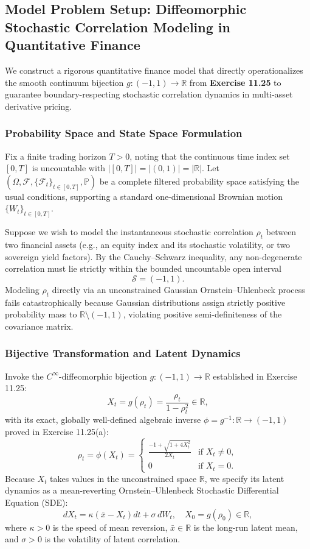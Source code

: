 \documentclass[11pt, letterpaper]{article}
\theoremstyle{definition}
\theoremstyle{remark}
\begin{document}
\subsection{Model Problem Setup: Diffeomorphic Stochastic Correlation Modeling in Quantitative Finance}

We construct a rigorous quantitative finance model that directly operationalizes the smooth continuum bijection $g : (-1, 1) \to \mathbb{R}$ from \textbf{Exercise 11.25} to guarantee boundary-respecting stochastic correlation dynamics in multi-asset derivative pricing.

\subsubsection{Probability Space and State Space Formulation}
Fix a finite trading horizon $T > 0$, noting that the continuous time index set $[0, T]$ is uncountable with $|[0, T]| = |(0, 1)| = |\mathbb{R}|$. Let $(\Omega, \mathcal{F}, \{\mathcal{F}_t\}_{t \in [0, T]}, \mathbb{P})$ be a complete filtered probability space satisfying the usual conditions, supporting a standard one-dimensional Brownian motion $\{W_t\}_{t \in [0, T]}$.

Suppose we wish to model the instantaneous stochastic correlation $\rho_t$ between two financial assets (e.g., an equity index and its stochastic volatility, or two sovereign yield factors). By the Cauchy–Schwarz inequality, any non-degenerate correlation must lie strictly within the bounded uncountable open interval
\[
\mathcal{S} = (-1, 1).
\]
Modeling $\rho_t$ directly via an unconstrained Gaussian Ornstein–Uhlenbeck process fails catastrophically because Gaussian distributions assign strictly positive probability mass to $\mathbb{R} \setminus (-1, 1)$, violating positive semi-definiteness of the covariance matrix.

\subsubsection{Bijective Transformation and Latent Dynamics}
Invoke the $C^\infty$-diffeomorphic bijection $g : (-1, 1) \to \mathbb{R}$ established in Exercise 11.25:
\[
X_t = g(\rho_t) = \frac{\rho_t}{1 - \rho_t^2} \in \mathbb{R},
\]
with its exact, globally well-defined algebraic inverse $\phi = g^{-1} : \mathbb{R} \to (-1, 1)$ proved in Exercise 11.25(a):
\[
\rho_t = \phi(X_t) = \begin{cases}
\displaystyle \frac{-1 + \sqrt{1 + 4X_t^2}}{2X_t} & \text{if } X_t \neq 0, \\[10pt]
0 & \text{if } X_t = 0.
\end{cases}
\]
Because $X_t$ takes values in the unconstrained space $\mathbb{R}$, we specify its latent dynamics as a mean-reverting Ornstein–Uhlenbeck Stochastic Differential Equation (SDE):
\begin{equation}
dX_t = \kappa\left(\bar{x} - X_t\right) dt + \sigma\, dW_t, \quad X_0 = g(\rho_0) \in \mathbb{R},
\end{equation}
where $\kappa > 0$ is the speed of mean reversion, $\bar{x} \in \mathbb{R}$ is the long-run latent mean, and $\sigma > 0$ is the volatility of latent correlation.
\end{document}
